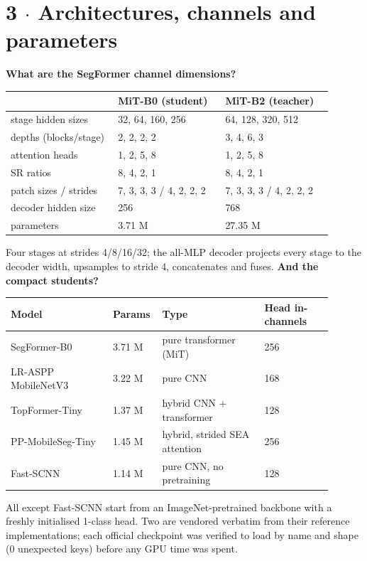\documentclass[10pt,a4paper]{article}
\newcommand{\qq}[1]{\medskip\noindent\textbf{\color{navy}#1}\par\nobreak}
\begin{document}
\section*{3 $\cdot$ Architectures, channels and parameters}
\qq{What are the SegFormer channel dimensions?}
\begin{center}\small\begin{tabular}{p{0.3\linewidth}p{0.3\linewidth}p{0.3\linewidth}}
\toprule
\textbf{} & \textbf{MiT-B0 (student)} & \textbf{MiT-B2 (teacher)} \\
\midrule
stage hidden sizes & 32, 64, 160, 256 & 64, 128, 320, 512 \\
depths (blocks/stage) & 2, 2, 2, 2 & 3, 4, 6, 3 \\
attention heads & 1, 2, 5, 8 & 1, 2, 5, 8 \\
SR ratios & 8, 4, 2, 1 & 8, 4, 2, 1 \\
patch sizes / strides & 7, 3, 3, 3 / 4, 2, 2, 2 & 7, 3, 3, 3 / 4, 2, 2, 2 \\
decoder hidden size & 256 & 768 \\
parameters & 3.71 M & 27.35 M \\
\bottomrule\end{tabular}\end{center}
Four stages at strides 4/8/16/32; the all-MLP decoder projects every stage to the decoder width, upsamples to stride 4, concatenates and fuses.
\qq{And the compact students?}
\begin{center}\small\begin{tabular}{p{0.3\linewidth}p{0.1\linewidth}p{0.3\linewidth}p{0.2\linewidth}}
\toprule
\textbf{Model} & \textbf{Params} & \textbf{Type} & \textbf{Head in-channels} \\
\midrule
SegFormer-B0 & 3.71 M & pure transformer (MiT) & 256 \\
LR-ASPP MobileNetV3 & 3.22 M & pure CNN & 168 \\
TopFormer-Tiny & 1.37 M & hybrid CNN + transformer & 128 \\
PP-MobileSeg-Tiny & 1.45 M & hybrid, strided SEA attention & 256 \\
Fast-SCNN & 1.14 M & pure CNN, no pretraining & 128 \\
\bottomrule\end{tabular}\end{center}
All except Fast-SCNN start from an ImageNet-pretrained backbone with a freshly initialised 1-class head. Two are vendored verbatim from their reference implementations; each official checkpoint was verified to load by name and shape (0 unexpected keys) before any GPU time was spent.
\end{document}
